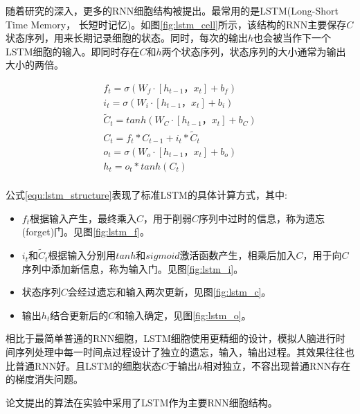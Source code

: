 随着研究的深入，更多的RNN细胞结构被提出。最常用的是LSTM(Long-Short Time Memory， 长短时记忆)\supercite{hochreiter1997long}。如图\ref{fig:lstm_cell}所示，该结构的RNN主要保存$C$状态序列，用来长期记录细胞的状态。同时，每次的输出$h$也会被当作下一个LSTM细胞的输入。即同时存在$C$和$h$两个状态序列，状态序列的大小通常为输出大小的两倍。
\par
\begin{equation} \label{equ:lstm_structure}
    \begin{gathered}
        f_t = \sigma (W_f \cdot [h_{t-1}， x_t] + b_f) \\
        i_t = \sigma (W_i \cdot [h_{t-1}， x_t] + b_i) \\
        \tilde{C}_t = tanh (W_C \cdot [h_{t-1}， x_t] + b_C) \\
        C_t = f_t * C_{t-1}+i_t * \tilde{C}_t \\
        o_t = \sigma (W_o \cdot [h_{t-1}， x_t] + b_o) \\
        h_t = o_t * tanh(C_t) \\
    \end{gathered}
\end{equation}
\par
公式\ref{equ:lstm_structure}表现了标准LSTM的具体计算方式\supercite{Understanding-LSTMs}，其中:
\begin{itemize}
    \item $f_t$根据输入产生，最终乘入$C$，用于削弱$C$序列中过时的信息，称为遗忘(forget)门。见图\ref{fig:lstm_f}。
    \item $i_t$和$\tilde{C}_t$根据输入分别用$tanh$和$sigmoid$激活函数产生，相乘后加入$C$，用于向$C$序列中添加新信息，称为输入门。见图\ref{fig:lstm_i}。
    \item 状态序列$C$会经过遗忘和输入两次更新，见图\ref{fig:lstm_c}。
    \item 输出$h_t$结合更新后的$C$和输入确定，见图\ref{fig:lstm_o}。
\end{itemize}
相比于最简单普通的RNN细胞，LSTM细胞使用更精细的设计，模拟人脑进行时间序列处理中每一时间点过程设计了独立的遗忘，输入，输出过程。其效果往往也比普通RNN好。且LSTM的细胞状态$C$于输出$h$相对独立，不容出现普通RNN存在的梯度消失问题\supercite{hochreiter1997long}。
\par
论文提出的算法在实验中采用了LSTM作为主要RNN细胞结构。

